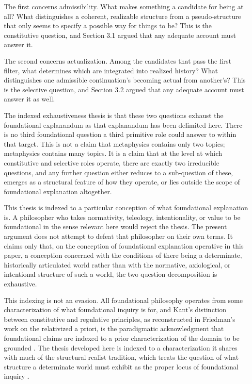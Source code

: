\documentclass[11pt]{article}
\theoremstyle{foundation}
\begin{document}
The first concerns admissibility. What makes something a candidate for being at all? What distinguishes a coherent, realizable structure from a pseudo-structure that only seems to specify a possible way for things to be? This is the constitutive question, and Section 3.1 argued that any adequate account must answer it.

The second concerns actualization. Among the candidates that pass the first filter, what determines which are integrated into realized history? What distinguishes one admissible continuation's becoming actual from another's? This is the selective question, and Section 3.2 argued that any adequate account must answer it as well.

The indexed exhaustiveness thesis is that these two questions exhaust the foundational explanandum as that explanandum has been delimited here. There is no third foundational question a third primitive role could answer to within that target. This is not a claim that metaphysics contains only two topics; metaphysics contains many topics. It is a claim that at the level at which constitutive and selective roles operate, there are exactly two irreducible questions, and any further question either reduces to a sub-question of these, emerges as a structural feature of how they operate, or lies outside the scope of foundational explanation altogether.

This thesis is indexed to a particular conception of what foundational explanation is. A philosopher who takes normativity, teleology, intentionality, or value to be foundational in the sense relevant here would reject the thesis. The present argument does not attempt to defeat that philosopher on their own terms. It claims only that, on the conception of foundational explanation operative in this paper, a conception concerned with the conditions of there being a determinate, historically articulated world rather than with the normative, axiological, or intentional structure of such a world, the two-question decomposition is exhaustive.

This indexing is not an evasion. All foundational philosophy operates from some characterization of what foundational inquiry is for, and Kant's distinction between constitutive and regulative principles, as reconstructed in Friedman's work on the relativized a priori, is the paradigmatic acknowledgment that foundational claims are indexed to a prior characterization of the domain to be grounded \citep{Friedman2001}. The thesis developed here is indexed to a characterization it shares with much of the structural realist tradition, which treats the question of what structure a determinate world must exhibit as the proper locus of foundational inquiry \citep{LadymanRoss2007,French2014}.
\end{document}
